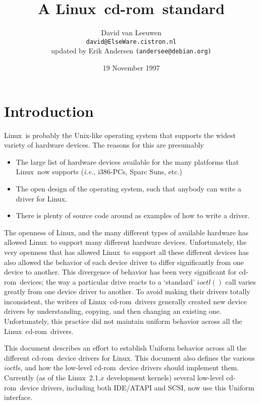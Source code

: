 \documentclass{article}
\newcommand{\newsection}[1]{\newpage\section{#1}}
\def\linux{{\sc Linux}}
\def\cdrom{{\sc cd-rom}}
\def\fo{\sl}                    %
\def\ie{{\fo i.e.}}
\begin{document}
\title{A \linux\ \cdrom\ standard}
\author{David van Leeuwen\\{\normalsize\tt david@ElseWare.cistron.nl}
\\{\footnotesize updated by Erik Andersen {\tt(andersee@debian.org)}}}
\date{19 November 1997}

\maketitle

\newsection{Introduction}

\linux\ is probably the Unix-like operating system that supports
the widest variety of hardware devices. The reasons for this are
presumably 
\begin{itemize} 
\item 
  The large list of hardware devices available for the many platforms
  that \linux\ now supports (\ie, i386-PCs, Sparc Suns, etc.)
\item 
  The open design of the operating system, such that anybody can write a
  driver for \linux.
\item 
  There is plenty of source code around as examples of how to write a driver.
\end{itemize}
The openness of \linux, and the many different types of available
hardware has allowed \linux\ to support many different hardware devices.
Unfortunately, the very openness that has allowed \linux\ to support
all these different devices has also allowed the behavior of each
device driver to differ significantly from one device to another.
This divergence of behavior has been very significant for \cdrom\
devices; the way a particular drive reacts to a `standard' $ioctl()$
call varies greatly from one device driver to another. To avoid making
their drivers totally inconsistent, the writers of \linux\ \cdrom\
drivers generally created new device drivers by understanding, copying,
and then changing an existing one. Unfortunately, this practice did not
maintain uniform behavior across all the \linux\ \cdrom\ drivers. 

This document describes an effort to establish Uniform behavior across
all the different \cdrom\ device drivers for \linux. This document also
defines the various $ioctl$s, and how the low-level \cdrom\ device
drivers should implement them. Currently (as of the \linux\ 2.1.$x$
development kernels) several low-level \cdrom\ device drivers, including
both IDE/ATAPI and SCSI, now use this Uniform interface.
\end{document}
